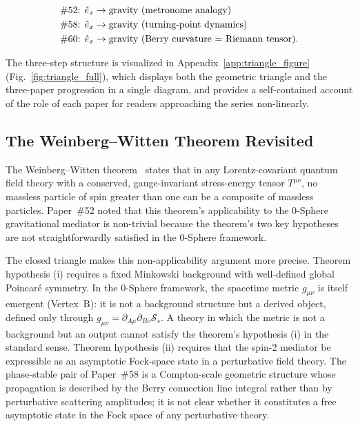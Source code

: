 \documentclass[%
 reprint, amsmath,amssymb, aps, prd, ]{revtex4-2}
\numberwithin{equation}{section}
\newcommand{\ehat}[1]{\hat{e}_{#1}}
\newcommand{\SyngeS}{\mathcal{S}}
\begin{document}
\begin{align}
&\text{\#52: } \ehat{x} \to \text{gravity (metronome analogy)}
\notag\\
&\text{\#58: } \ehat{x} \to \text{gravity (turning-point dynamics)}
\notag\\
&\text{\#60: } \ehat{x} \to \text{gravity (Berry curvature = Riemann tensor).}
\label{eq:three_steps}
\end{align}

The three-step structure is visualized in Appendix~\ref{app:triangle_figure} (Fig.~\ref{fig:triangle_full}), which displays both the geometric triangle and the three-paper progression in a single diagram, and provides a self-contained account of the role of each paper for readers approaching the series non-linearly.

\subsection{The Weinberg--Witten Theorem Revisited}

The Weinberg--Witten theorem~\cite{WeinbergWitten1980} states that in any Lorentz-covariant quantum field theory with a conserved, gauge-invariant stress-energy tensor $T^{\mu\nu}$, no massless particle of spin greater than one can be a composite of massless particles.
Paper~\#52 noted that this theorem's applicability to the 0-Sphere gravitational mediator is non-trivial because the theorem's two key hypotheses are not straightforwardly satisfied in the 0-Sphere framework.

The closed triangle makes this non-applicability argument more precise.
Theorem hypothesis (i) requires a fixed Minkowski background with well-defined global Poincaré symmetry.
In the 0-Sphere framework, the spacetime metric $g_{\mu\nu}$ is itself emergent (Vertex~B): it is not a background structure but a derived object, defined only through $g_{\mu\nu} = \partial_{A\mu}\partial_{B\nu}\SyngeS_s$.
A theory in which the metric is not a background but an output cannot satisfy the theorem's hypothesis (i) in the standard sense.
Theorem hypothesis (ii) requires that the spin-2 mediator be expressible as an asymptotic Fock-space state in a perturbative field theory.
The phase-stable pair of Paper~\#58 is a Compton-scale geometric structure whose propagation is described by the Berry connection line integral rather than by perturbative scattering amplitudes; it is not clear whether it constitutes a free asymptotic state in the Fock space of any perturbative theory.
\end{document}
